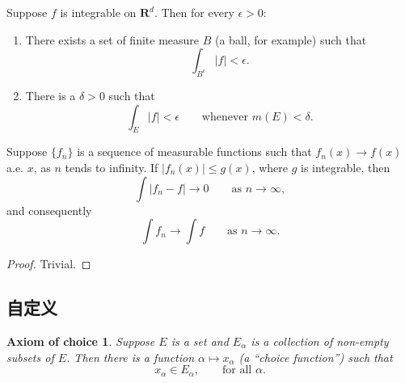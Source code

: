 \begin{proposition}
  Suppose $f$ is integrable on $\mathbf{R}^d$. Then for every $\epsilon > 0$:
  \begin{enumerate}
    \renewcommand{\theenumi}{\roman{enumi}}
    \item There exists a set of finite measure $B$ (a ball, for example) such that
    \begin{equation}
    \int_{B^c} |f| < \epsilon.
    \end{equation}
    \item There is a $\delta > 0$ such that
    \begin{equation}
    \int_E |f| < \epsilon \qquad \text{whenever } m(E) < \delta.
    \end{equation}
  \end{enumerate}
\end{proposition}

\begin{theorem}
  Suppose $\{f_n\}$ is a sequence of measurable functions such that
  $f_n(x) \to f(x)$ a.e. $x$, as $n$ tends to infinity.
  If $|f_n(x)| \leq g(x)$, where $g$ is integrable, then
  \begin{equation}
  \int |f_n - f| \to 0 \qquad \text{as } n \to \infty,
  \end{equation}
  and consequently
  \begin{equation}
  \int f_n \to \int f \qquad \text{as } n \to \infty.
  \end{equation}
\end{theorem}

\begin{proof}
  Trivial.
\end{proof}



\subsection{自定义}

\newtheorem*{axiomofchoice}{Axiom of choice}
\begin{axiomofchoice}
  Suppose $E$ is a set and ${E_\alpha}$ is a collection of
  non-empty subsets of $E$. Then there is a function $\alpha
  \mapsto x_\alpha$ (a ``choice function'') such that
  \begin{equation}
  x_\alpha \in E_\alpha,\qquad \text{for all }\alpha.
  \end{equation}
\end{axiomofchoice}

